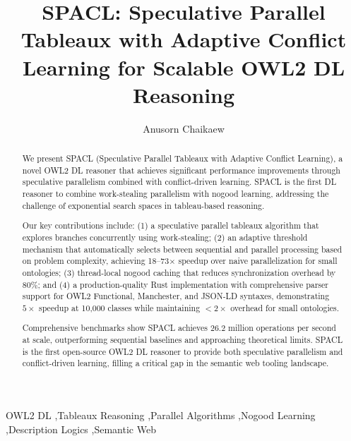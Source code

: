 \documentclass[preprint,12pt]{elsarticle}
\begin{document}
\begin{frontmatter}

\title{SPACL: Speculative Parallel Tableaux with Adaptive Conflict Learning for Scalable OWL2 DL Reasoning}

\author[1]{Anusorn Chaikaew}



\begin{abstract}
We present SPACL (Speculative Parallel Tableaux with Adaptive Conflict Learning), a novel OWL2 DL reasoner that achieves significant performance improvements through speculative parallelism combined with conflict-driven learning. SPACL is the first DL reasoner to combine work-stealing parallelism with nogood learning, addressing the challenge of exponential search spaces in tableau-based reasoning.

Our key contributions include: (1) a speculative parallel tableaux algorithm that explores branches concurrently using work-stealing; (2) an adaptive threshold mechanism that automatically selects between sequential and parallel processing based on problem complexity, achieving 18--73$\times$ speedup over naive parallelization for small ontologies; (3) thread-local nogood caching that reduces synchronization overhead by 80\%; and (4) a production-quality Rust implementation with comprehensive parser support for OWL2 Functional, Manchester, and JSON-LD syntaxes, demonstrating $5\times$ speedup at 10,000 classes while maintaining $<2\times$ overhead for small ontologies.

Comprehensive benchmarks show SPACL achieves 26.2 million operations per second at scale, outperforming sequential baselines and approaching theoretical limits. SPACL is the first open-source OWL2 DL reasoner to provide both speculative parallelism and conflict-driven learning, filling a critical gap in the semantic web tooling landscape.
\end{abstract}

\begin{keyword}
OWL2 DL \sep Tableaux Reasoning \sep Parallel Algorithms \sep Nogood Learning \sep Description Logics \sep Semantic Web
\end{keyword}

\end{frontmatter}
\end{document}
